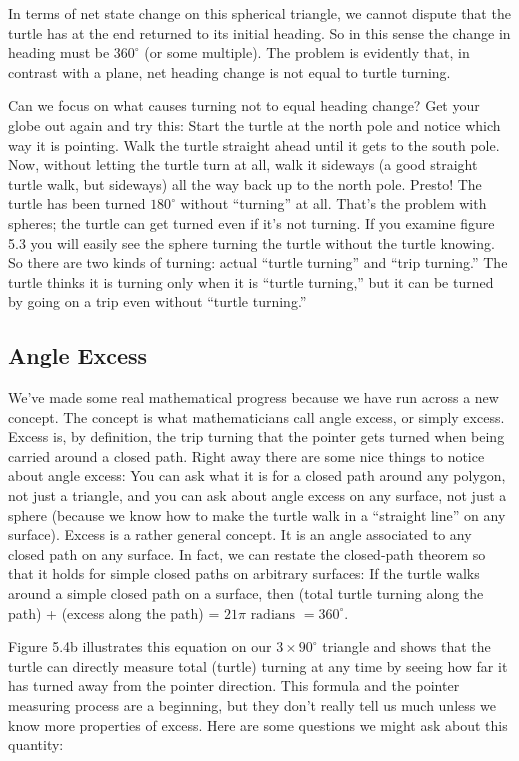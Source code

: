 \documentclass{book}
\begin{document}
In terms of net state change on this spherical triangle, we cannot
dispute that the turtle has at the end returned to its initial heading. So
in this sense the change in heading must be $360^{\circ}$ (or some multiple). The
problem is evidently that, in contrast with a plane, net heading change
is not equal to turtle turning.

Can we focus on what causes turning not to equal heading change?
Get your globe out again and try this: Start the turtle at the north pole
and notice which way it is pointing. Walk the turtle straight ahead until
it gets to the south pole. Now, without letting the turtle turn at all,
walk it sideways (a good straight turtle walk, but sideways) all the way
back up to the north pole. Presto! The turtle has been turned $180^{\circ}$
without ``turning'' at all. That's the problem with spheres; the turtle
can get turned even if it's not turning. If you examine figure 5.3 you
will easily see the sphere turning the turtle without the turtle knowing.
So there are two kinds of turning: actual ``turtle turning'' and ``trip
turning.'' The turtle thinks it is turning only when it is ``turtle turning,''
but it can be turned by going on a trip even without ``turtle turning.''

\subsection{Angle Excess}

We've made some real mathematical progress because we have run across
a new concept. The concept is what mathematicians call angle excess, or
simply excess. Excess is, by definition, the trip turning that the pointer
gets turned when being carried around a closed path. Right away there
are some nice things to notice about angle excess: You can ask what it
is for a closed path around any polygon, not just a triangle, and you
can ask about angle excess on any surface, not just a sphere (because we
know how to make the turtle walk in a ``straight line'' on any surface).
Excess is a rather general concept. It is an angle associated to any
closed path on any surface. In fact, we can restate the closed-path
theorem so that it holds for simple closed paths on arbitrary surfaces:
If the turtle walks around a simple closed path on a surface, then
(total turtle turning along the path) + (excess along the path)
= $21 \pi \text{ radians } = 360^{\circ}$.

Figure 5.4b illustrates this equation on our $3 \times 90^{\circ}$ triangle and shows
that the turtle can directly measure total (turtle) turning at any time
by seeing how far it has turned away from the pointer direction.
This formula and the pointer measuring process are a beginning, but
they don't really tell us much unless we know more properties of excess.
Here are some questions we might ask about this quantity:
\end{document}
